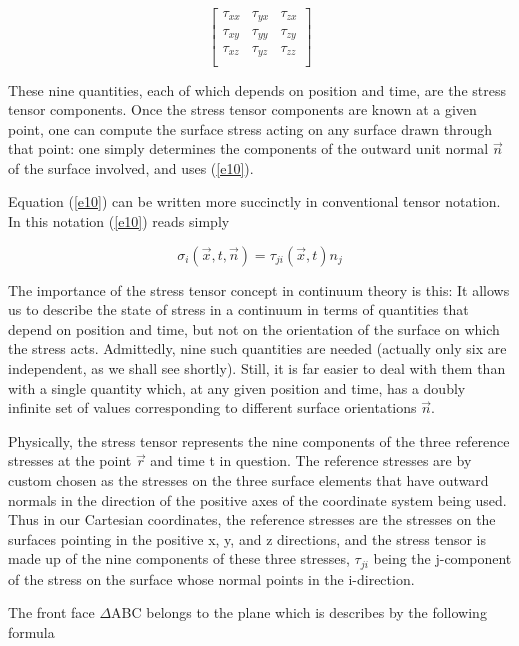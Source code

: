 \documentclass{article}
\begin{document}
{$$\begin{bmatrix}
\tau_{xx} & \tau_{yx} & \tau_{zx} \\
\tau_{xy} & \tau_{yy} & \tau_{zy} \\
\tau_{xz} & \tau_{yz} & \tau_{zz} \\
\end{bmatrix}$$

These nine quantities, each of which depends on position and time, are the stress tensor components. Once the stress tensor components are known at a given point, one can compute the surface stress acting on any surface drawn through that point: one simply determines the components of the outward unit normal $\overrightarrow{n}$ of the surface involved, and uses (\ref{e10}).

Equation (\ref{e10}) can be written more succinctly in conventional tensor notation. In this notation (\ref{e10}) reads simply

\begin{equation}
\sigma_{i}(\overrightarrow{x},t,\overrightarrow{n}) = \tau_{ji}(\overrightarrow{x},t)n_{j} \label{e11}
\end{equation}

The importance of the stress tensor concept in continuum theory is this: It allows us to describe the state of stress in a continuum in terms of quantities that depend on position and time, but not on the orientation of the surface on which the stress acts. Admittedly, nine such quantities are needed (actually only six are independent, as we shall see shortly). Still, it is far easier to deal with them than with a single quantity which, at any given position and time, has a doubly infinite set of values corresponding to different surface
orientations $\overrightarrow{n}$.

Physically, the stress tensor represents the nine components of the three reference stresses at the point $\overrightarrow{r}$ and time t in question. The reference stresses are by custom chosen as the stresses on the three surface elements that have outward normals in the direction of the positive axes of the coordinate system being used. Thus in our Cartesian coordinates, the reference stresses are the stresses on the surfaces pointing in the positive x, y, and z directions, and the stress tensor is made up of the nine components of these three stresses, $\tau_{ji}$ being the j-component of the stress on the surface whose normal points in the i-direction.

The front face $\Delta$ABC belongs to the plane which is describes by the following formula

}
\end{document}

